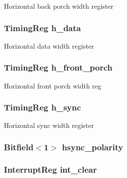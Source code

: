 \label{classHDLcd_a2bafb13ce63125c580ceb36a81af2817}
Horizontal back porch width register \hypertarget{classHDLcd_a3610505ba43835b9d3dd548e1848644e}{
\subsubsection[{h\_\-data}]{\setlength{\rightskip}{0pt plus 5cm}TimingReg {\bf h\_\-data}}}
\label{classHDLcd_a3610505ba43835b9d3dd548e1848644e}
Horizontal data width register \hypertarget{classHDLcd_ab4874d5422f23d038b1a7274da8f43e7}{
\subsubsection[{h\_\-front\_\-porch}]{\setlength{\rightskip}{0pt plus 5cm}TimingReg {\bf h\_\-front\_\-porch}}}
\label{classHDLcd_ab4874d5422f23d038b1a7274da8f43e7}
Horizontal front porch width reg \hypertarget{classHDLcd_a91efa037cb143bc92279f190b4423748}{
\subsubsection[{h\_\-sync}]{\setlength{\rightskip}{0pt plus 5cm}TimingReg {\bf h\_\-sync}}}
\label{classHDLcd_a91efa037cb143bc92279f190b4423748}
Horizontal sync width register \hypertarget{classHDLcd_ae1b5cd178099ce9f30eafb12ccf1bde8}{
\subsubsection[{hsync\_\-polarity}]{\setlength{\rightskip}{0pt plus 5cm}Bitfield$<$1$>$ {\bf hsync\_\-polarity}}}
\label{classHDLcd_ae1b5cd178099ce9f30eafb12ccf1bde8}
\hypertarget{classHDLcd_ab96a978a299a4bf65839845c1c33f414}{
\subsubsection[{int\_\-clear}]{\setlength{\rightskip}{0pt plus 5cm}InterruptReg {\bf int\_\-clear}}}
